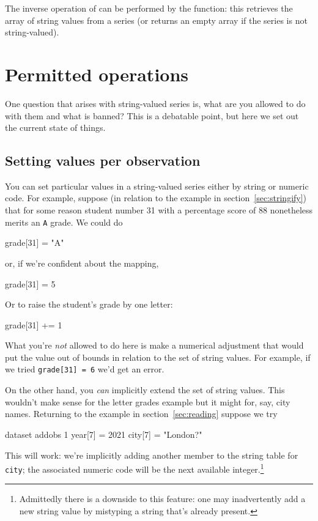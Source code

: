 The inverse operation of  can be performed by the
 function: this retrieves the array of string values
from a series (or returns an empty array if the series is not
string-valued).

\section{Permitted operations}

One question that arises with string-valued series is, what are you
allowed to do with them and what is banned? This is a debatable point,
but here we set out the current state of things.

\subsection{Setting values per observation}

You can set particular values in a string-valued series either by
string or numeric code. For example, suppose (in relation to the
example in section~\ref{sec:stringify}) that for some reason student
number 31 with a percentage score of 88 nonetheless merits an
\texttt{A} grade. We could do
\begin{code}
grade[31] = "A"
\end{code}
or, if we're confident about the mapping,
\begin{code}
grade[31] = 5
\end{code}
Or to raise the student's grade by one letter:
\begin{code}
grade[31] += 1
\end{code}

What you're \textit{not} allowed to do here is make a numerical
adjustment that would put the value out of bounds in relation to the
set of string values. For example, if we tried \texttt{grade[31] = 6}
we'd get an error. 

On the other hand, you \textit{can} implicitly extend the set of
string values. This wouldn't make sense for the letter grades example
but it might for, say, city names. Returning to the example in
section~\ref{sec:reading} suppose we try
%
\begin{code}
dataset addobs 1
year[7] = 2021
city[7] = "London?"
\end{code}
%
This will work: we're implicitly adding another member to the string
table for \texttt{city}; the associated numeric code will be the next
available integer.\footnote{Admittedly there is a downside to this
  feature: one may inadvertently add a new string value by mistyping a
  string that's already present.}

